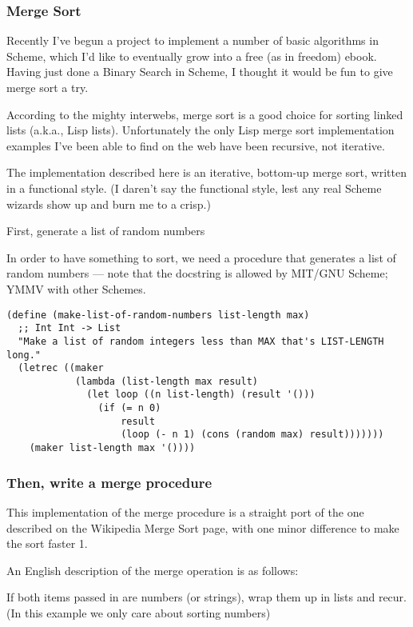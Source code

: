 \documentclass[12pt,openright,draft]{book}
\begin{document}
\subsubsection{Merge Sort}

Recently I've begun a project to implement a number of basic
algorithms in Scheme, which I'd like to eventually grow into a free
(as in freedom) ebook. Having just done a Binary Search in Scheme, I
thought it would be fun to give merge sort a try.

According to the mighty interwebs, merge sort is a good choice for
sorting linked lists (a.k.a., Lisp lists). Unfortunately the only Lisp
merge sort implementation examples I've been able to find on the web
have been recursive, not iterative.

The implementation described here is an iterative, bottom-up merge
sort, written in a functional style. (I daren't say the functional
style, lest any real Scheme wizards show up and burn me to a crisp.)

First, generate a list of random numbers

In order to have something to sort, we need a procedure that generates
a list of random numbers --- note that the docstring is allowed by
MIT/GNU Scheme; YMMV with other Schemes.

\begin{verbatim}
(define (make-list-of-random-numbers list-length max)
  ;; Int Int -> List
  "Make a list of random integers less than MAX that's LIST-LENGTH long."
  (letrec ((maker
            (lambda (list-length max result)
              (let loop ((n list-length) (result '()))
                (if (= n 0)
                    result
                    (loop (- n 1) (cons (random max) result)))))))
    (maker list-length max '())))
\end{verbatim}

\subsubsection{Then, write a merge procedure}

This implementation of the merge procedure is a straight port of the
one described on the Wikipedia Merge Sort page, with one minor
difference to make the sort faster 1.

An English description of the merge operation is as follows:

If both items passed in are numbers (or strings), wrap them up in
lists and recur. (In this example we only care about sorting numbers)
\end{document}
